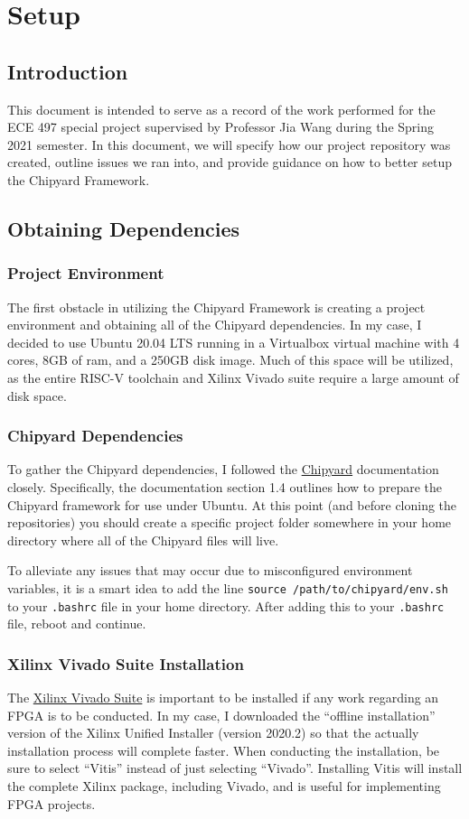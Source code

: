 \chapter{Setup}
\section{Introduction}
This document is intended to serve as a record of the work performed for the ECE 497 special project supervised by Professor Jia Wang during the Spring 2021 semester.
In this document, we will specify how our project repository was created, outline issues we ran into, and provide guidance on how to better setup the Chipyard Framework.

\section{Obtaining Dependencies}

\subsection{Project Environment}
The first obstacle in utilizing the Chipyard Framework is creating a project environment and obtaining all of the Chipyard dependencies.
In my case, I decided to use Ubuntu 20.04 LTS running in a Virtualbox virtual machine with 4 cores, 8GB of ram, and a 250GB disk image.
Much of this space will be utilized, as the entire RISC-V toolchain and Xilinx Vivado suite require a large amount of disk space.

\subsection{Chipyard Dependencies}
To gather the Chipyard dependencies, I followed the \href{https://chipyard.readthedocs.io/en/latest/}{Chipyard} documentation closely.
Specifically, the documentation section 1.4 outlines how to prepare the Chipyard framework for use under Ubuntu.
At this point (and before cloning the repositories) you should create a specific project folder somewhere in your home directory where all of the Chipyard files will live.

To alleviate any issues that may occur due to misconfigured environment variables, it is a smart idea to add the line \texttt{source /path/to/chipyard/env.sh} to your \texttt{.bashrc} file in your home directory.
After adding this to your \texttt{.bashrc} file, reboot and continue.

\subsection{Xilinx Vivado Suite Installation}
The \href{https://www.xilinx.com/support/download.html}{Xilinx Vivado Suite} is important to be installed if any work regarding an FPGA is to be conducted.
In my case, I downloaded the ``offline installation'' version of the Xilinx Unified Installer (version 2020.2) so that the actually installation process will complete faster.
When conducting the installation, be sure to select ``Vitis'' instead of just selecting ``Vivado''.
Installing Vitis will install the complete Xilinx package, including Vivado, and is useful for implementing FPGA projects.

